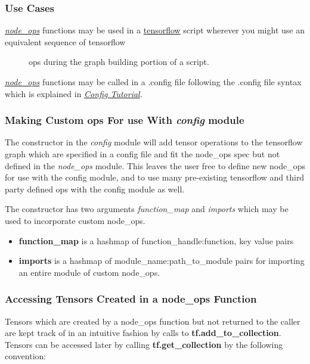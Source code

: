 \documentclass[letterpaper,10pt,english]{sphinxmanual}
\begin{document}
\subsubsection{Use Cases}
\label{node_ops:use-cases}\begin{description}
\item[{{\hyperref[node_ops::doc]{\emph{\emph{node\_ops}}}} functions may be used in a \href{https://www.tensorflow.org/}{tensorflow} script wherever you might use an equivalent sequence of tensorflow}] \leavevmode
ops during the graph building portion of a script.

\end{description}

{\hyperref[node_ops::doc]{\emph{\emph{node\_ops}}}} functions may be called in a .config file following the .config file syntax which is explained in {\hyperref[config_tutorial::doc]{\emph{\emph{Config Tutorial}}}}.


\subsubsection{Making Custom ops For use With \emph{config} module}
\label{node_ops:making-custom-ops-for-use-with-config-module}
The {\hyperref[config:config.AntGraph]{\emph{}}} constructor in the \emph{config} module will add tensor operations to the tensorflow graph which are specified
in a config file and fit the node\_ops spec but not defined in the \emph{node\_ops} module. This leaves the user free to define new
node\_ops for use with the config module, and to use many pre-existing tensorflow and third party defined ops with the config
module as well.

The {\hyperref[config:config.AntGraph]{\emph{}}} constructor has two arguments \emph{function\_map} and \emph{imports} which may be used to incorporate custom node\_ops.
\begin{itemize}
\item {} 
\textbf{function\_map} is a hashmap of function\_handle:function, key value pairs

\item {} 
\textbf{imports} is a hashmap of module\_name:path\_to\_module pairs for importing an entire module of custom node\_ops.

\end{itemize}


\subsubsection{Accessing Tensors Created in a node\_ops Function}
\label{node_ops:accessing-tensors-created-in-a-node-ops-function}
Tensors which are created by a node\_ops function but not returned to the caller are kept track of in an intuitive fashion
by calls to \textbf{tf.add\_to\_collection}. Tensors can be accessed later by calling \textbf{tf.get\_collection} by the following convention:
\end{document}
